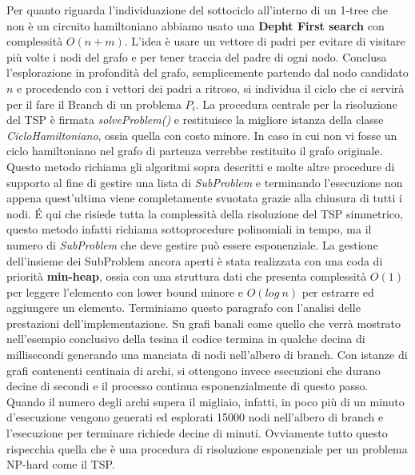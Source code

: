 \documentclass[
	article,			%
	12pt,				%
	oneside,			%
	a4paper,			%
	english,			%
	italian,				%
	sumario=tradicional,
	]{abntex2}
\begin{document}
\newline
\newline
Per quanto riguarda l'individuazione del sottociclo all'interno di un 1-tree che non è un circuito hamiltoniano abbiamo usato una \textbf{Depht First search} con complessità $O(n+m)$. L'idea è usare un vettore di padri per evitare di visitare più volte i nodi del grafo e per tener traccia del padre di ogni nodo. Conclusa l'esplorazione in profondità del grafo, semplicemente partendo dal nodo candidato $n$ e procedendo con i vettori dei padri a ritroso, si individua il ciclo che ci servirà per il fare il Branch di un problema $P_i$.
\newline
\newline
La procedura centrale per la risoluzione del TSP è firmata \textit{solveProblem()} e restituisce la migliore istanza della classe \textit{CicloHamiltoniano}, ossia quella con costo minore. In caso in cui non vi fosse un ciclo hamiltoniano nel grafo di partenza verrebbe restituito il grafo originale. Questo metodo richiama gli algoritmi sopra descritti e molte altre procedure di supporto al fine di gestire una lista di \textit{SubProblem} e terminando l'esecuzione non appena quest'ultima viene completamente svuotata grazie alla chiusura di tutti i nodi. \'E qui che risiede tutta la complessità della risoluzione del TSP simmetrico, questo metodo infatti richiama sottoprocedure polinomiali in tempo, ma il numero di \textit{SubProblem} che deve gestire può essere esponenziale.
\newline
La gestione dell'insieme dei SubProblem ancora aperti è stata realizzata con una coda di priorità \textbf{min-heap}, ossia con una struttura dati che presenta complessità $O(1)$ per leggere l'elemento con lower bound minore e $O(log\:n)$ per estrarre ed aggiungere un elemento.
\newline
\newline
Terminiamo questo paragrafo con l'analisi delle prestazioni dell'implementazione. Su grafi banali come quello che verrà mostrato nell'esempio conclusivo della tesina il codice termina in qualche decina di millisecondi generando una manciata di nodi nell'albero di branch. Con istanze di grafi contenenti centinaia di archi, si ottengono invece esecuzioni che durano decine di secondi e il processo continua esponenzialmente di questo passo. Quando il numero degli archi supera il migliaio, infatti, in poco più di un minuto d'esecuzione vengono generati ed esplorati 15000 nodi nell'albero di branch e l'esecuzione per terminare richiede decine di minuti. Ovviamente tutto questo rispecchia quella che è una procedura di risoluzione esponenziale per un problema NP-hard come il TSP.
\end{document}
